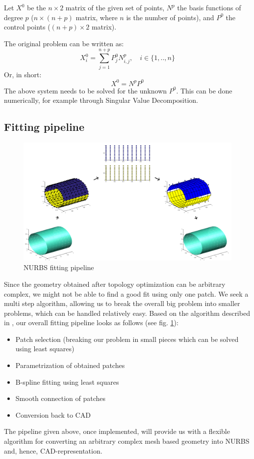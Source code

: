 Let $X^{0}$ be the $n \times 2$ matrix of the given set of points, $N^{p}$ the basis functions of degree $p$ ($n \times (n+p)$ matrix, where $n$ is the number of points), and $P^{0}$ the control points ($(n+p) \times 2$ matrix).

The original problem can be written as:
\begin{equation}
X_{i}^{0} = \sum\limits_{j=1}^{n+p} P_{j}^{0} N_{i,j}^{p}, \quad i \in \{1,..,n\}
\end{equation}
Or, in short:
\begin{equation}
X^{0} = N^{p} P^{0}
\end{equation}
The above system needs to be solved for the unknown $P^{0}$. This can be done numerically, for example through Singular Value Decomposition. 

\subsection{Fitting pipeline}
\begin{figure}
\centering
  \includegraphics[width=.85\linewidth]{Fitting_workflow.png}
  \caption{NURBS fitting pipeline}
  \label{fig:fitting_pipeline}
\end{figure}
Since the geometry obtained after topology optimization can be arbitrary complex, we might not be able to find a good fit using only one patch. We seek a multi step algorithm, allowing us to break the overall big problem into smaller problems, which can be handled relatively easy.
Based on the algorithm described in \cite{eck1996automatic}, our overall fitting pipeline looks as follows (see fig. \ref{fig:fitting_pipeline}):
\begin{itemize}
	\item Patch selection (breaking our problem in small pieces which can be solved using least squares)
	\item Parametrization of obtained patches
	\item B-spline fitting using least squares
	\item Smooth connection of patches
	\item Conversion back to CAD
\end{itemize}

The pipeline given above, once implemented, will provide us with a flexible algorithm for converting an arbitrary complex mesh based geometry into NURBS and, hence, CAD-representation.
